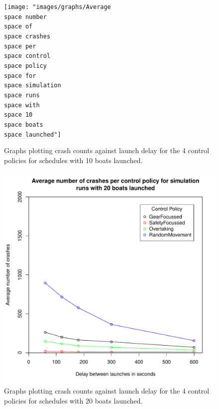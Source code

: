   \begin{figure}
  \begin{center}
    \texttt{[image: "images/graphs/Average\\space number\\space of\\space crashes\\space per\\space control\\space policy\\space for\\space simulation\\space runs\\space with\\space 10\\space boats\\space launched"]}
    \caption{Graphs plotting crash counts against launch delay for the 4 control policies for schedules with 10 boats launched.}
    \label{experiments:fig:crash_counts_10_launches}
  \end{center}
  \end{figure}
  
  \begin{figure}
  \begin{center}
    \includegraphics[scale=0.8]{"images/graphs/Average number of crashes per control policy for simulation runs with 20 boats launched"}
    \caption{Graphs plotting crash counts against launch delay for the 4 control policies for schedules with 20 boats launched.}
    \label{experiments:fig:crash_counts_20_launches}
  \end{center}
  \end{figure}
  
